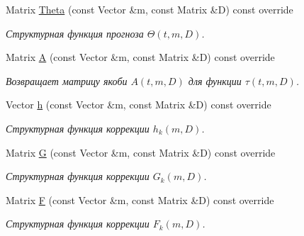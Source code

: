 \begin{DoxyCompactItemize}
Matrix \hyperlink{class_tasks_1_1_continuous_discrete_1_1_landing_linear_a783147d41d5d8dff4facd246fc064bb4}{Theta} (const Vector \&m, const Matrix \&D) const override
\begin{DoxyCompactList}\small\item\em Структурная функция прогноза $\Theta(t,m,D)$. \end{DoxyCompactList}\item 
Matrix \hyperlink{class_tasks_1_1_continuous_discrete_1_1_landing_linear_ae584bc7b596882f07b18d2a39dcdfa32}{A} (const Vector \&m, const Matrix \&D) const override
\begin{DoxyCompactList}\small\item\em Возвращает матрицу якоби $A(t, m, D)$ для функции $\tau(t, m, D)$. \end{DoxyCompactList}\item 
Vector \hyperlink{class_tasks_1_1_continuous_discrete_1_1_landing_linear_a66480881fd719faddafe5104b548db78}{h} (const Vector \&m, const Matrix \&D) const override
\begin{DoxyCompactList}\small\item\em Структурная функция коррекции $h_k(m, D)$. \end{DoxyCompactList}\item 
Matrix \hyperlink{class_tasks_1_1_continuous_discrete_1_1_landing_linear_a3b589b0ac53f7fe936438bc7c82f5c3d}{G} (const Vector \&m, const Matrix \&D) const override
\begin{DoxyCompactList}\small\item\em Структурная функция коррекции $G_k(m, D)$. \end{DoxyCompactList}\item 
Matrix \hyperlink{class_tasks_1_1_continuous_discrete_1_1_landing_linear_a5b5a327866160bf687dbc6d82a801ce8}{F} (const Vector \&m, const Matrix \&D) const override
\begin{DoxyCompactList}\small\item\em Структурная функция коррекции $F_k(m, D)$. \end{DoxyCompactList}\end{DoxyCompactItemize}
